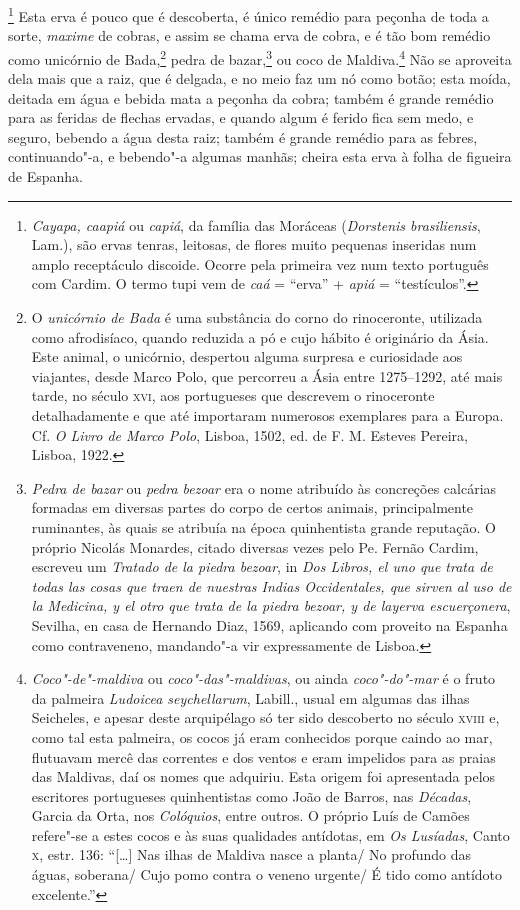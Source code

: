\begin{linenumbers}
\footnote{ \textit{Cayapa, caapiá} ou \textit{capiá},
da família das Moráceas (\textit{Dorstenis brasiliensis}, Lam.), são
ervas tenras, leitosas, de flores muito pequenas inseridas num amplo
receptáculo discoide. Ocorre pela primeira vez num texto português com
Cardim. O termo tupi vem de \textit{caá} = ``erva'' + \textit{apiá} = ``testículos''.} 
Esta erva é pouco que é descoberta, é único
remédio para peçonha de toda a sorte, \textit{maxime} de cobras, e assim se chama
erva de cobra, e é tão bom remédio como unicórnio de Bada,\footnote{ O
\textit{unicórnio de Bada} é uma substância do corno do rinoceronte,
utilizada como afrodisíaco, quando reduzida a pó e cujo hábito é
originário da Ásia. Este animal, o unicórnio, despertou alguma surpresa
e curiosidade aos viajantes, desde Marco Polo, que percorreu a Ásia
entre 1275--1292, até mais tarde, no século \textsc{xvi}, aos portugueses que
descrevem o rinoceronte detalhadamente e que até importaram numerosos
exemplares para a Europa. Cf. \textit{O Livro de Marco Polo}, Lisboa,
1502, ed. de F. M. Esteves Pereira, Lisboa, 1922.} pedra de 
bazar,\footnote{ \textit{Pedra de bazar} ou \textit{pedra bezoar} era o
nome atribuído às concreções calcárias formadas em diversas partes
do corpo de certos animais, principalmente ruminantes, às quais se
atribuía na época quinhentista grande reputação. O próprio Nicolás
Monardes, citado diversas vezes pelo Pe. Fernão Cardim, escreveu um
\textit{Tratado de la piedra bezoar}, in \textit{Dos Libros, el uno que
trata de todas las cosas que traen de nuestras Indias Occidentales,
que sirven al uso de la Medicina, y el otro que trata de la piedra
bezoar, y de layerva escuerçonera}, Sevilha, en casa de Hernando Diaz,
1569, aplicando com proveito na Espanha como contraveneno,
mandando"-a vir expressamente de Lisboa.} ou coco de 
Maldiva.\footnote{ \textit{Coco"-de"-maldiva} 
ou \textit{coco"-das"-maldivas}, ou ainda
\textit{coco"-do"-mar} é o fruto da palmeira \textit{Ludoicea
seychellarum}, Labill., usual em algumas das ilhas Seicheles, e apesar
deste arquipélago só ter sido descoberto no século \textsc{xviii} e, como tal
esta palmeira, os cocos já eram conhecidos porque caindo ao mar,
flutuavam mercê das correntes e dos ventos e eram impelidos para as
praias das Maldivas, daí os nomes que adquiriu. Esta origem foi
apresentada pelos escritores portugueses quinhentistas como João de
Barros, nas \textit{Décadas}, Garcia da Orta, nos \textit{Colóquios}, 
entre outros. O próprio Luís de Camões refere"-se a estes cocos e às
suas qualidades antídotas, em \textit{Os Lusíadas}, Canto \textsc{x}, estr. 136:
 ``[\ldots{}] Nas ilhas de Maldiva nasce a planta/ No profundo das águas,
soberana/ Cujo pomo contra o veneno urgente/ É tido como antídoto
excelente.''} Não se aproveita dela mais que a raiz, que é delgada, e no
meio faz um nó como botão; esta moída, deitada em água e bebida mata a
peçonha da cobra; também é grande remédio para as feridas de flechas
ervadas, e quando algum é ferido fica sem medo, e seguro, bebendo a
água desta raiz; também é grande remédio para as febres, continuando"-a,
e bebendo"-a algumas manhãs; cheira esta erva à folha de figueira de Espanha.


\end{linenumbers}
